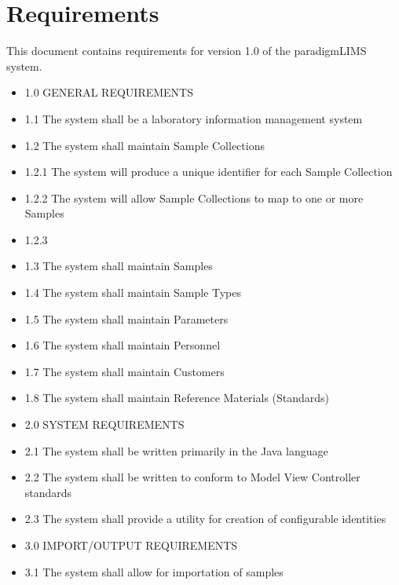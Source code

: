 \documentclass[11pt]{article}
\begin{document}
\section*{Requirements}

This document contains requirements for version 1.0 of the paradigmLIMS system.

\begin{itemize}
\item 1.0 GENERAL REQUIREMENTS
\item 1.1 The system shall be a laboratory information management system
\item 1.2 The system shall maintain Sample Collections
\item 1.2.1 The system will produce a unique identifier for each Sample Collection
\item 1.2.2 The system will allow Sample Collections to map to one or more Samples
\item 1.2.3
\item 1.3 The system shall maintain Samples
\item 1.4 The system shall maintain Sample Types
\item 1.5 The system shall maintain Parameters
\item 1.6 The system shall maintain Personnel
\item 1.7 The system shall maintain Customers
\item 1.8 The system shall maintain Reference Materials (Standards)

\item 2.0 SYSTEM REQUIREMENTS
\item 2.1 The system shall be written primarily in the Java language
\item 2.2 The system shall be written to conform to Model View Controller standards
\item 2.3 The system shall provide a utility for creation of configurable identities
\item 3.0 IMPORT/OUTPUT REQUIREMENTS
\item 3.1 The system shall allow for importation of samples
\end{itemize}
\end{document}
